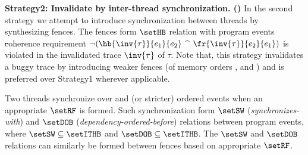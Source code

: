 \noindent
{\bf Strategy2: Invalidate by inter-thread synchronization.
(\wkfence)}\newline
In the second strategy we attempt to introduce synchronization
between threads by synthesizing fences. The fences form
$\setHB$ relation with program events \st coherence
requirement
$\neg(\hb{\inv{\tau}}{e_1}{e_2}$ $\^$ $\fr{\inv{\tau}}{e_2}{e_1})$ is
violated in the invalidated trace $\inv{\tau}$ of $\tau$.
%
Note that, this strategy invalidates a buggy trace by introducing 
weaker fences (of memory orders \rel, \acq and \acqrel) and 
is preferred over Strategy1 wherever applicable.

Two threads synchronize over \rel and \acq (or stricter) ordered
events when an appropriate $\setRF$ is formed. Such synchronization
form $\setSW$ ({\it synchronizes-with}) and $\setDOB$ 
({\it dependency-ordered-before}) relations between program events,
\cite{batty2011mathematizing}\cite{C11}
where $\setSW \subseteq \setITHB$ and $\setDOB \subseteq \setITHB$.
%
The $\setSW$ and $\setDOB$ relations can similarly be formed between
fences based on appropriate $\setRF$.



